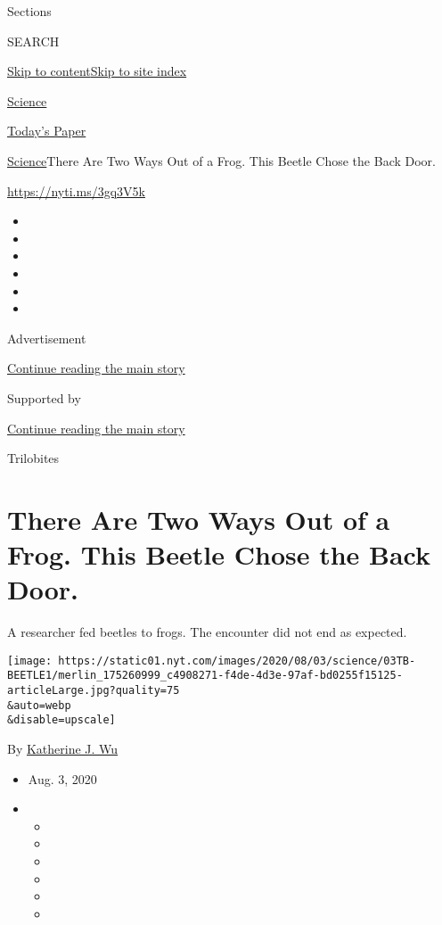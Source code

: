 Sections

SEARCH

\protect\hyperlink{site-content}{Skip to
content}\protect\hyperlink{site-index}{Skip to site index}

\href{https://www.nytimes.com/section/science}{Science}

\href{https://myaccount.nytimes.com/auth/login?response_type=cookie\&client_id=vi}{}

\href{https://www.nytimes.com/section/todayspaper}{Today's Paper}

\href{/section/science}{Science}\textbar{}There Are Two Ways Out of a
Frog. This Beetle Chose the Back Door.

\url{https://nyti.ms/3gq3V5k}

\begin{itemize}
\item
\item
\item
\item
\item
\item
\end{itemize}

Advertisement

\protect\hyperlink{after-top}{Continue reading the main story}

Supported by

\protect\hyperlink{after-sponsor}{Continue reading the main story}

Trilobites

\hypertarget{there-are-two-ways-out-of-a-frog-this-beetle-chose-the-back-door}{%
\section{There Are Two Ways Out of a Frog. This Beetle Chose the Back
Door.}\label{there-are-two-ways-out-of-a-frog-this-beetle-chose-the-back-door}}

A researcher fed beetles to frogs. The encounter did not end as
expected.

\texttt{[image: https://static01.nyt.com/images/2020/08/03/science/03TB-BEETLE1/merlin\_175260999\_c4908271-f4de-4d3e-97af-bd0255f15125-articleLarge.jpg?quality=75\\\&auto=webp\\\&disable=upscale]}

By \href{https://www.nytimes.com/by/katherine-j--wu}{Katherine J. Wu}

\begin{itemize}
\item
  Aug. 3, 2020
\item
  \begin{itemize}
  \item
  \item
  \item
  \item
  \item
  \item
  \end{itemize}
\end{itemize}


